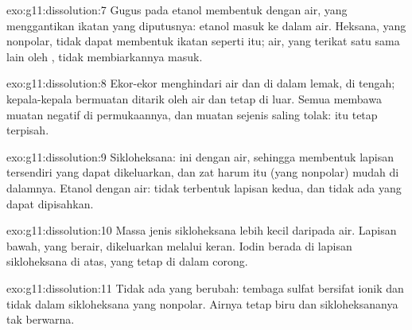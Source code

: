\begin{solution}{exo:g11:dissolution:7}
Gugus  pada etanol membentuk  dengan 
air, yang menggantikan ikatan yang diputusnya: etanol masuk ke dalam
air. Heksana, yang nonpolar, tidak dapat membentuk ikatan seperti itu;
 air, yang terikat satu sama lain oleh ,
tidak membiarkannya masuk.
\end{solution}

\begin{solution}{exo:g11:dissolution:8}
Ekor-ekor  menghindari air dan  di dalam lemak, di
tengah; kepala-kepala bermuatan ditarik oleh air dan tetap di luar.
Semua  membawa muatan negatif di permukaannya, dan muatan sejenis
saling tolak:  itu tetap terpisah.
\end{solution}

\begin{solution}{exo:g11:dissolution:9}
Sikloheksana:  ini  dengan air, sehingga
membentuk lapisan tersendiri yang dapat dikeluarkan, dan zat harum itu
(yang nonpolar) mudah  di dalamnya. Etanol  dengan
air: tidak terbentuk lapisan kedua, dan tidak ada yang dapat dipisahkan.
\end{solution}

\begin{solution}{exo:g11:dissolution:10}
Massa jenis sikloheksana lebih kecil daripada air. Lapisan bawah, yang
berair, dikeluarkan melalui keran. Iodin berada di lapisan sikloheksana
di atas, yang tetap di dalam corong.
\end{solution}

\begin{solution}{exo:g11:dissolution:11}
Tidak ada yang berubah: tembaga sulfat bersifat ionik dan tidak 
dalam sikloheksana yang nonpolar. Airnya tetap biru dan sikloheksananya
tak berwarna.
\end{solution}


